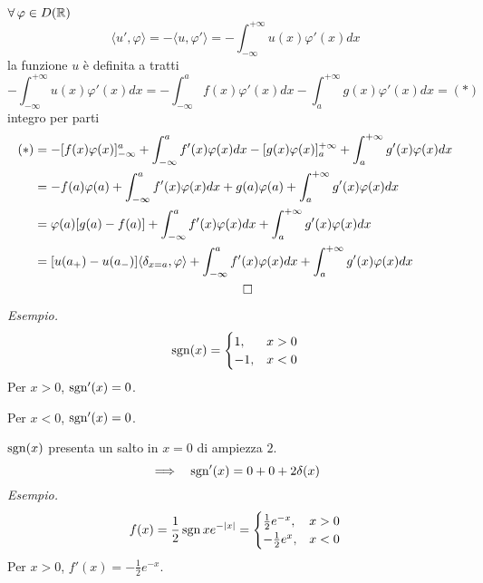 $\forall \varphi \in D(\RR)$
\begin{equation*}
\langle u',\varphi \rangle = - \langle u,\varphi '\rangle = - \int ^{ + \infty }_{ - \infty } u(x) \varphi '(x) dx
\end{equation*}
la funzione $u$ è definita a tratti
\begin{equation*}
- \int ^{ + \infty }_{ - \infty } u(x) \varphi '(x) dx = -\int ^{a}_{ - \infty } f(x) \varphi '(x) dx - \int ^{ + \infty }_{a} g(x) \varphi '(x) dx = (*)
\end{equation*}
integro per parti
\begin{gather*}
\begin{aligned}
(*) & = - [ f(x) \varphi (x)]^{a}_{ - \infty } + \int ^{a}_{ - \infty } f'(x) \varphi (x) dx - [ g(x) \varphi (x)]^{ + \infty }_{a} + \int ^{ + \infty }_{a} g'(x) \varphi (x) dx\\
 & = - f(a) \varphi (a) + \int ^{a}_{ - \infty } f'(x) \varphi (x) dx + g(a) \varphi (a) + \int ^{ + \infty }_{a} g'(x) \varphi (x) dx\\
 & = \varphi (a)[ g(a) - f(a)] + \int ^{a}_{ - \infty } f'(x) \varphi (x) dx + \int ^{ + \infty }_{a} g'(x) \varphi (x) dx\\
 & = [ u(a_{ + }) - u(a_{ - })] \langle \delta _{x = a} ,\varphi \rangle + \int ^{a}_{ - \infty } f'(x) \varphi (x) dx + \int ^{ + \infty }_{a} g'(x) \varphi (x) dx
\end{aligned}\\
\qed 
\end{gather*}
\textit{Esempio.}
\begin{equation*}
\operatorname{sgn}(x) = \begin{cases}
1, & x > 0\\
- 1, & x < 0
\end{cases}
\end{equation*}
Per $x > 0$, $\operatorname{sgn} '(x) = 0$.

Per $x < 0$, $\operatorname{sgn} '(x) = 0$.

$\operatorname{sgn}(x)$ presenta un salto in $x = 0$ di ampiezza $2$.
\begin{equation*}
\implies \ \ \operatorname{sgn} '(x) = 0 + 0 + 2\delta (x)
\end{equation*}
\textit{Esempio.}
\begin{equation*}
f(x) = \frac{1}{2}\operatorname{sgn} xe^{ - | x| } = \begin{cases}
\frac{1}{2} e^{ - x} , & x > 0\\
- \frac{1}{2} e^{x} , & x < 0
\end{cases}
\end{equation*}
Per $x > 0$, $f'(x) = - \frac{1}{2} e^{ - x}$.

